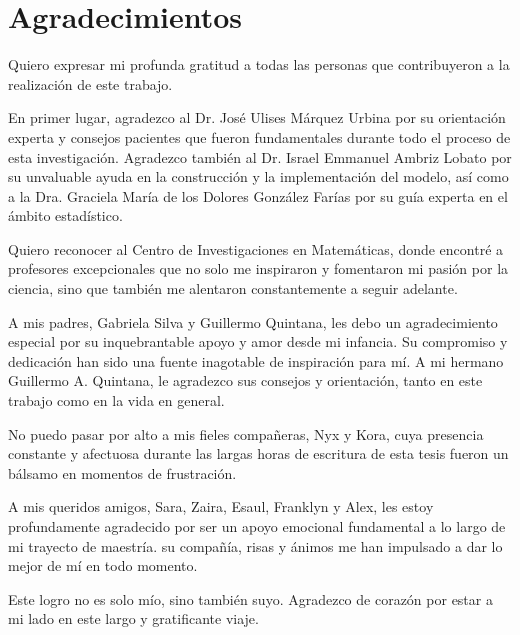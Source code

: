 \chapter*{Agradecimientos}

Quiero expresar mi profunda gratitud a todas las personas que contribuyeron a la realización de este trabajo.

En primer lugar, agradezco al Dr. José Ulises Márquez Urbina por su orientación experta y consejos pacientes que fueron fundamentales durante todo el proceso de esta investigación. Agradezco también al Dr. Israel Emmanuel Ambriz Lobato por su unvaluable ayuda en la construcción y la implementación del modelo, así como a la Dra. Graciela María de los Dolores González Farías por su guía experta en el ámbito estadístico.

Quiero reconocer al Centro de Investigaciones en Matemáticas, donde encontré a profesores excepcionales que no solo me inspiraron y fomentaron mi pasión por la ciencia, sino que también me alentaron constantemente a seguir adelante.

A mis padres, Gabriela Silva y Guillermo Quintana, les debo un agradecimiento especial por su inquebrantable apoyo y amor desde mi infancia. Su compromiso y dedicación han sido una fuente inagotable de inspiración para mí. A mi hermano Guillermo A. Quintana, le agradezco sus consejos y orientación, tanto en este trabajo como en la vida en general.

No puedo pasar por alto a mis fieles compañeras, Nyx y Kora, cuya presencia constante y afectuosa durante las largas horas de escritura de esta tesis fueron un bálsamo en momentos de frustración.

A mis queridos amigos, Sara, Zaira, Esaul, Franklyn y Alex, les estoy profundamente agradecido por ser un apoyo emocional fundamental a lo largo de mi trayecto de maestría. su compañía, risas y ánimos me han impulsado a dar lo mejor de mí en todo momento.

Este logro no es solo mío, sino también suyo. Agradezco de corazón por estar a mi lado en este largo y gratificante viaje.

